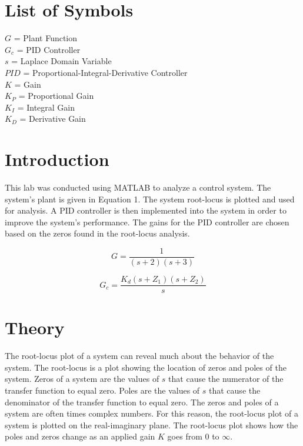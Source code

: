 \documentclass[12pt]{article}
\begin{document}
\section*{\fontsize{12}{12}\selectfont \large List of Symbols}
$G$ = Plant Function \\
$G_{c}$ = PID Controller \\
$s$ = Laplace Domain Variable \\
$PID$ = Proportional-Integral-Derivative Controller \\
$K$ = Gain \\
$K_{P}$ = Proportional Gain \\
$K_{I}$ = Integral Gain \\
$K_{D}$ = Derivative Gain \\

\newpage



\section*{\fontsize{12}{12}\selectfont \large Introduction}
This lab was conducted using MATLAB to analyze a control system. The system's plant is given in Equation 1. The system root-locus is plotted and used for analysis. A PID controller is then implemented into the system in order to improve the system's performance. The gains for the PID controller are chosen based on the zeros found in the root-locus analysis.
\bigskip

\begin{equation}
G = \frac{1}{(s+2)(s+3)}
\end{equation}
\bigskip

\begin{equation}
G_{c} = \frac{K_{d}(s+Z_{1})(s+Z_{2})}{s}
\end{equation}
\bigskip


\section*{\fontsize{12}{12}\selectfont \large Theory}
The root-locus plot of a system can reveal much about the behavior of the system. The root-locus is a plot showing the location of zeros and poles of the system. Zeros of a system are the values of $s$ that cause the numerator of the transfer function to equal zero. Poles are the values of $s$ that cause the denominator of the transfer function to equal zero. The zeros and poles of a system are often times complex numbers. For this reason, the root-locus plot of a system is plotted on the real-imaginary plane. The root-locus plot shows how the poles and zeros change as an applied gain $K$ goes from $0$ to $\infty$.
\bigskip
\end{document}

